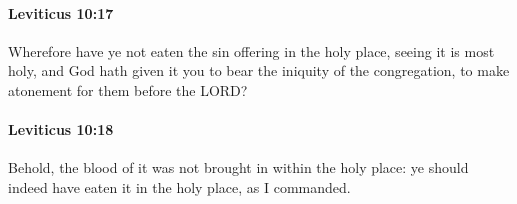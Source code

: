 		\paragraph{Leviticus 10:17} %
			\label{LEVITICUS-10-17}

			Wherefore have ye not eaten the sin offering in the holy place, seeing it is most holy, and God hath given it you to bear the iniquity of the congregation, to make atonement for them before the LORD?


		\paragraph{Leviticus 10:18} %
			\label{LEVITICUS-10-18}

			Behold, the blood of it was not brought in within the holy place: ye should indeed have eaten it in the holy place, as I commanded.


